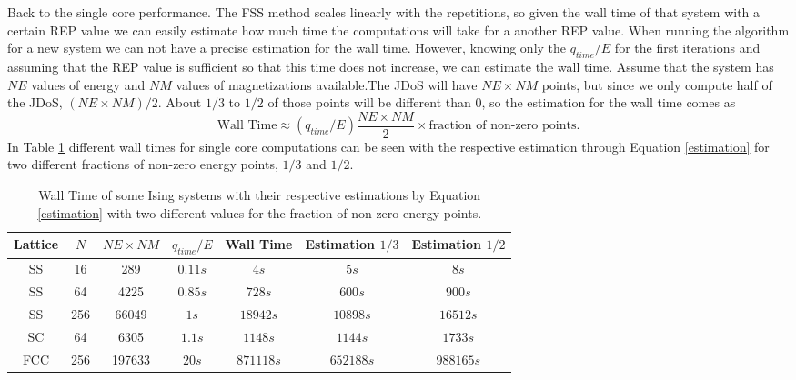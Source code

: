 Back to the single core performance. The FSS method scales linearly with the repetitions, so given the wall time of that system with a certain REP value we can easily estimate how much time the computations will take for a another REP value.
When running the algorithm for a new system we can not have a precise estimation for the wall time. However, knowing only the $q_{time}/E$ for the first iterations and assuming that the REP value is sufficient so that this time does not increase, we can estimate the wall time. Assume that the system has $NE$ values of energy and $NM$ values of magnetizations available.The JDoS will have $NE \times NM$ points, but since we only compute half of the JDoS, $( NE \times NM ) / 2$. About $1/3$ to $1/2$ of those points will be different than 0, so the estimation for the wall time comes as 
\begin{equation}\label{estimation}
	\text{Wall Time} \approx (q_{time}/E) \frac{NE \times NM}{2} \times \text{fraction of non-zero points} .
\end{equation}
In Table \ref{wall_time_table} different wall times for single core computations can be seen with the respective estimation through Equation \ref{estimation} for two different fractions of non-zero energy points, $1/3$ and $1/2$. 

\begin{table}[h]
\centering
\caption{Wall Time of some Ising systems with their respective estimations by Equation \ref{estimation} with two different values for the fraction of non-zero energy points.} 
\begin{tabular}{c|c|c|c|c|c|c}
Lattice & $N$   & $NE \times NM$ & $q_{time}/E$ & Wall Time & Estimation $1/3$ & Estimation $1/2$ \\ \hline
SS      & 16  & 289                         & $0.11s $        & $4s$        &$ 5s$                  & $8s$                  \\
SS      & 64  & 4225                        & $0.85s$         & $728s$      & $600s $               & $900s    $ \\
SS      & 256 & 66049                       & $1s$            & $18942s$    & $10898s $             & $16512s  $ \\
SC      & 64  & 6305                        & $1.1s $         & $1148s$     & $1144s$              & $1733s $           \\
FCC     & 256 & 197633                      & $20s$           &$ 871118s$   & $652188s$      & $988165s$            
\end{tabular}
\label{wall_time_table}
\end{table}


